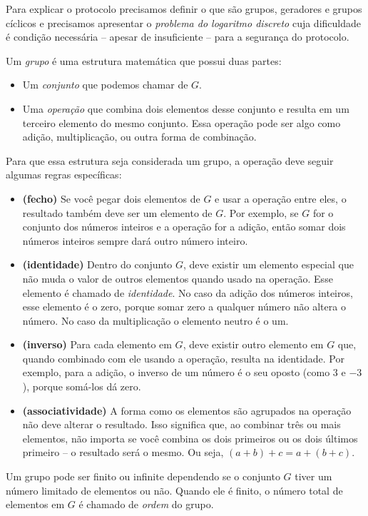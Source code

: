 Para explicar o protocolo precisamos definir o que são grupos, geradores e grupos cíclicos e precisamos apresentar o {\em problema do logaritmo discreto} cuja dificuldade é condição necessária -- apesar de insuficiente -- para a segurança do protocolo.

Um {\em grupo} é uma estrutura matemática que possui duas partes:
\begin{itemize}
\item Um {\em conjunto} que podemos chamar de $G$.
\item Uma {\em operação} que combina dois elementos desse conjunto e resulta em um terceiro elemento do mesmo conjunto.
  Essa operação pode ser algo como adição, multiplicação, ou outra forma de combinação.
  \end{itemize}

Para que essa estrutura seja considerada um grupo, a operação deve seguir algumas regras específicas:
\begin{itemize}
\item[] {\bf (fecho)} Se você pegar dois elementos de $G$ e usar a operação entre eles, o resultado também deve ser um elemento de $G$.
  Por exemplo, se $G$ for o conjunto dos números inteiros e a operação for a adição, então somar dois números inteiros sempre dará outro número inteiro.
\item[] {\bf (identidade)} Dentro do conjunto $G$, deve existir um elemento especial que não muda o valor de outros elementos quando usado na operação.
  Esse elemento é chamado de {\em identidade}.
  No caso da adição dos números inteiros, esse elemento é o zero, porque somar zero a qualquer número não altera o número.
  No caso da multiplicação o elemento neutro é o um.
\item[] {\bf (inverso)} Para cada elemento em $G$, deve existir outro elemento em $G$ que, quando combinado com ele usando a operação, resulta na identidade.
  Por exemplo, para a adição, o inverso de um número é o seu oposto (como $3$ e $-3$), porque somá-los dá zero.
\item[] {\bf (associatividade)} A forma como os elementos são agrupados na operação não deve alterar o resultado. Isso significa que, ao combinar três ou mais elementos, não importa se você combina os dois primeiros ou os dois últimos primeiro – o resultado será o mesmo.
  Ou seja, $(a + b) + c = a + (b + c)$.
\end{itemize}

Um grupo pode ser finito ou infinite dependendo se o conjunto $G$ tiver um número limitado de elementos ou não.
Quando ele é finito, o número total de elementos em $G$ é chamado de {\em ordem} do grupo.

